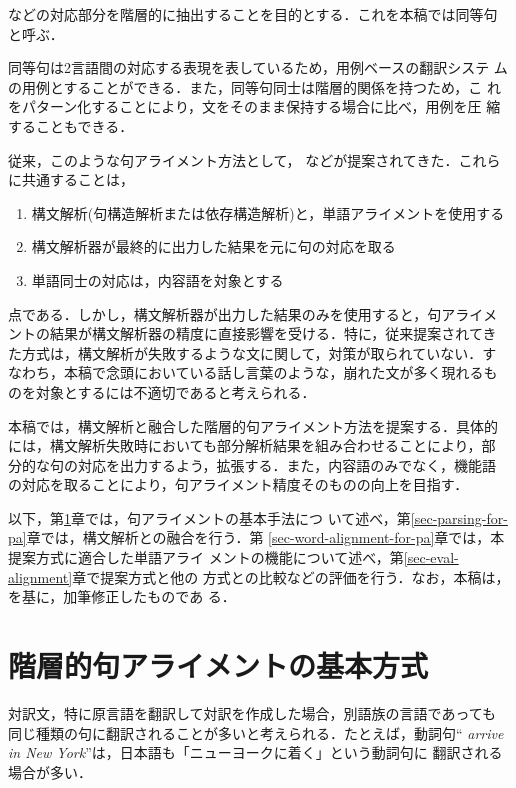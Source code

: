 \noindent
などの対応部分を階層的に抽出することを目的とする．これを本稿では同等句
と呼ぶ．

同等句は2言語間の対応する表現を表しているため，用例ベースの翻訳システ
ムの用例とすることができる．また，同等句同士は階層的関係を持つため，こ
れをパターン化することにより，文をそのまま保持する場合に比べ，用例を圧
縮することもできる．

従来，このような句アライメント方法として，
などが提案されてきた．これらに共通することは，

\begin{enumerate}\itemsep=0mm
\item 構文解析(句構造解析または依存構造解析)と，単語アライメントを使用する
\item 構文解析器が最終的に出力した結果を元に句の対応を取る
\item 単語同士の対応は，内容語を対象とする
\end{enumerate}

\noindent
点である．しかし，構文解析器が出力した結果のみを使用すると，句アライメ
ントの結果が構文解析器の精度に直接影響を受ける．特に，従来提案されてき
た方式は，構文解析が失敗するような文に関して，対策が取られていない．す
なわち，本稿で念頭においている話し言葉のような，崩れた文が多く現れるも
のを対象とするには不適切であると考えられる．

本稿では，構文解析と融合した階層的句アライメント方法を提案する．具体的
には，構文解析失敗時においても部分解析結果を組み合わせることにより，部
分的な句の対応を出力するよう，拡張する．また，内容語のみでなく，機能語
の対応を取ることにより，句アライメント精度そのものの向上を目指す．

以下，第\ref{sec-phrase-alignment}章では，句アライメントの基本手法につ
いて述べ，第\ref{sec-parsing-for-pa}章では，構文解析との融合を行う．第
\ref{sec-word-alignment-for-pa}章では，本提案方式に適合した単語アライ
メントの機能について述べ，第\ref{sec-eval-alignment}章で提案方式と他の
方式との比較などの評価を行う．なお，本稿は，
を基に，加筆修正したものであ
る．

\section{階層的句アライメントの基本方式}
\label{sec-phrase-alignment}

対訳文，特に原言語を翻訳して対訳を作成した場合，別語族の言語であっても
同じ種類の句に翻訳されることが多いと考えられる．たとえば，動詞句``{\em
arrive in New York}''は，日本語も「ニューヨークに着く」という動詞句に
翻訳される場合が多い．

